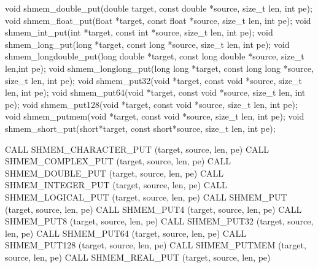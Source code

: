 \synC   %

void shmem_double_put(double target, const double *source, size_t len, int pe);
void shmem_float_put(float *target, const float *source, size_t len, int pe);
void shmem_int_put(int *target, const int *source, size_t len, int pe);
void shmem_long_put(long *target, const long *source, size_t len, int pe);
void shmem_longdouble_put(long double *target, const long double *source, size_t len,int pe);
void shmem_longlong_put(long long *target, const long long *source, size_t len, int pe);
void shmem_put32(void *target, const void *source, size_t len, int pe);
void shmem_put64(void *target, const void *source, size_t len, int pe);
void shmem_put128(void *target, const void *source, size_t len, int pe);
void shmem_putmem(void *target, const void *source, size_t len, int pe);
void shmem_short_put(short*target, const short*source, size_t len, int pe);

\synF   %

CALL SHMEM_CHARACTER_PUT (target, source, len, pe)
CALL SHMEM_COMPLEX_PUT (target, source, len, pe)
CALL SHMEM_DOUBLE_PUT (target, source, len, pe)
CALL SHMEM_INTEGER_PUT (target, source, len, pe)
CALL SHMEM_LOGICAL_PUT (target, source, len, pe)
CALL SHMEM_PUT (target, source, len, pe)
CALL SHMEM_PUT4 (target, source, len, pe)
CALL SHMEM_PUT8 (target, source, len, pe)
CALL SHMEM_PUT32 (target, source, len, pe)
CALL SHMEM_PUT64 (target, source, len, pe)
CALL SHMEM_PUT128 (target, source, len, pe)
CALL SHMEM_PUTMEM (target, source, len, pe)
CALL SHMEM_REAL_PUT (target, source, len, pe)

